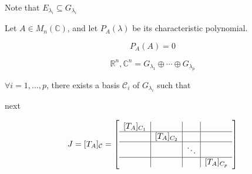\begin{remark}
	Note that $E_{\lambda_i} \subseteq G_{\lambda_i}$
\end{remark}

\begin{theorem}
	Let $A \in M_n(\mathbb{C})$, and let $P_A(\lambda)$ be its characteristic polynomial.

	\[P_A(A) = 0\]
\end{theorem}

\begin{theorem}
	\begin{equation} \label{eq:g-eigenspace}
		\mathbb{R}^n, \mathbb{C}^n = G_{\lambda_1} \oplus \cdots \oplus G_{\lambda_p}
	\end{equation}
\end{theorem}

\begin{theorem}
	$\forall i = 1, \ldots, p$, there exists a basis $\mathcal{C}_i$ of $G_{\lambda_i}$ such that


	next

	\[J = [T_A]_\mathcal{C} = \left[\begin{array}{c|c|c|c}
		[T_A]_{C_1}&&&\\\hline
		&[T_A]_{C_2}&&\\\hline
		&&\ddots&\\\hline
		&&&[T_A]_{C_p}
	\end{array}\right]\]
\end{theorem}